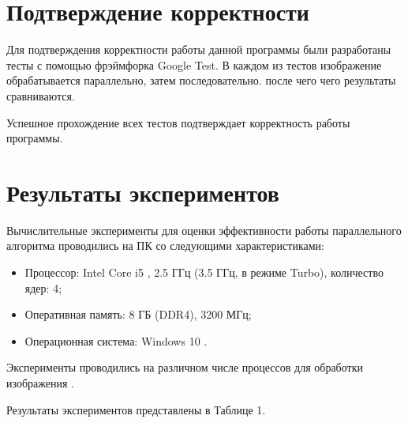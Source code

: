 \documentclass{report}
\begin{document}
\section*{Подтверждение корректности}
Для подтверждения корректности работы данной программы были разработаны тесты с помощью фрэймфорка Google Test. В каждом из тестов изображение обрабатывается параллельно, затем последовательно. после чего чего результаты сравниваются.

\par Успешное прохождение всех тестов подтверждает корректность работы программы.
\newpage

\section*{Результаты экспериментов}
Вычислительные эксперименты для оценки эффективности работы параллельного алгоритма проводились на ПК со следующими характеристиками:
\begin{itemize}
\item Процессор: Intel Core i5 , 2.5 ГГц (3.5 ГГц, в режиме Turbo), количество ядер: 4;
\item Оперативная память: 8 ГБ (DDR4), 3200 МГц;
\item Операционная система: Windows 10 .
\end{itemize}

\par Эксперименты проводились на различном числе процессов для обработки изображения .
\par Результаты экспериментов представлены в Таблице 1.
\end{document}
